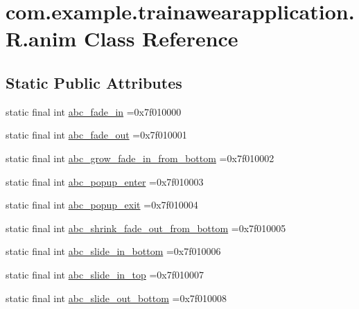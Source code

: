 \hypertarget{classcom_1_1example_1_1trainawearapplication_1_1_r_1_1anim}{}\section{com.\+example.\+trainawearapplication.\+R.\+anim Class Reference}
\label{classcom_1_1example_1_1trainawearapplication_1_1_r_1_1anim}
\subsection*{Static Public Attributes}
\begin{DoxyCompactItemize}
\item 
static final int \mbox{\hyperlink{classcom_1_1example_1_1trainawearapplication_1_1_r_1_1anim_a82e75f30f76bfd5491b27925c496aac5}{abc\+\_\+fade\+\_\+in}} =0x7f010000
\item 
static final int \mbox{\hyperlink{classcom_1_1example_1_1trainawearapplication_1_1_r_1_1anim_a5bdab140d6889be3a42fe9f4e615d31e}{abc\+\_\+fade\+\_\+out}} =0x7f010001
\item 
static final int \mbox{\hyperlink{classcom_1_1example_1_1trainawearapplication_1_1_r_1_1anim_abe5f895f11fbaee60fedc2a567dd9c65}{abc\+\_\+grow\+\_\+fade\+\_\+in\+\_\+from\+\_\+bottom}} =0x7f010002
\item 
static final int \mbox{\hyperlink{classcom_1_1example_1_1trainawearapplication_1_1_r_1_1anim_a18238f3aff799d96c912d48df13171a1}{abc\+\_\+popup\+\_\+enter}} =0x7f010003
\item 
static final int \mbox{\hyperlink{classcom_1_1example_1_1trainawearapplication_1_1_r_1_1anim_a09eeb54f965bbeb84d19c874610c4f7d}{abc\+\_\+popup\+\_\+exit}} =0x7f010004
\item 
static final int \mbox{\hyperlink{classcom_1_1example_1_1trainawearapplication_1_1_r_1_1anim_ad2c63ae8fc600ebed38d0209727e75cc}{abc\+\_\+shrink\+\_\+fade\+\_\+out\+\_\+from\+\_\+bottom}} =0x7f010005
\item 
static final int \mbox{\hyperlink{classcom_1_1example_1_1trainawearapplication_1_1_r_1_1anim_a5106912dfffb6aeddce122f6bc00bbd9}{abc\+\_\+slide\+\_\+in\+\_\+bottom}} =0x7f010006
\item 
static final int \mbox{\hyperlink{classcom_1_1example_1_1trainawearapplication_1_1_r_1_1anim_ad0387b62f9c840e92a4073d3682a91ff}{abc\+\_\+slide\+\_\+in\+\_\+top}} =0x7f010007
\item 
static final int \mbox{\hyperlink{classcom_1_1example_1_1trainawearapplication_1_1_r_1_1anim_af8cba488565a8c4fc37b1dac15e66526}{abc\+\_\+slide\+\_\+out\+\_\+bottom}} =0x7f010008

\end{DoxyCompactItemize}

